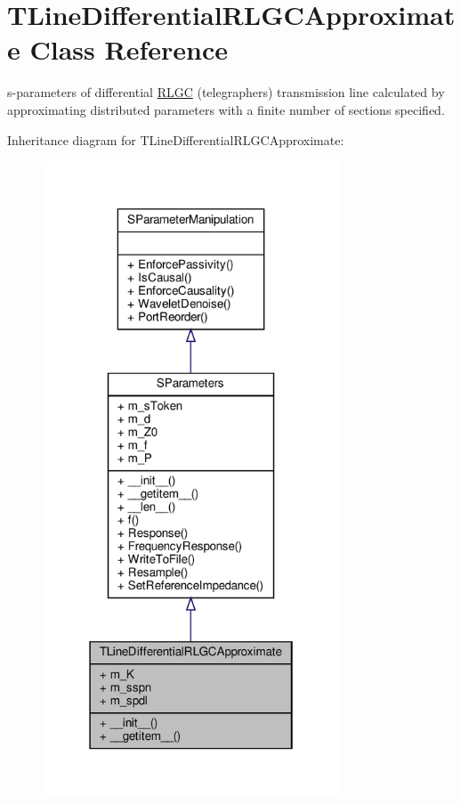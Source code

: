 \hypertarget{classSignalIntegrity_1_1SParameters_1_1Devices_1_1TLineDifferentialRLGCApproximate_1_1TLineDifferentialRLGCApproximate}{}\section{T\+Line\+Differential\+R\+L\+G\+C\+Approximate Class Reference}
\label{classSignalIntegrity_1_1SParameters_1_1Devices_1_1TLineDifferentialRLGCApproximate_1_1TLineDifferentialRLGCApproximate}


s-\/parameters of differential \hyperlink{namespaceSignalIntegrity_1_1SParameters_1_1RLGC}{R\+L\+GC} (telegrapher\textquotesingle{}s) transmission line calculated by approximating distributed parameters with a finite number of sections specified.  




Inheritance diagram for T\+Line\+Differential\+R\+L\+G\+C\+Approximate\+:\nopagebreak
\begin{figure}[H]
\begin{center}
\leavevmode
\includegraphics[width=250pt]{classSignalIntegrity_1_1SParameters_1_1Devices_1_1TLineDifferentialRLGCApproximate_1_1TLineDiffebb8034df57e391d821dbb5c30e6ad43d}
\end{center}
\end{figure}


